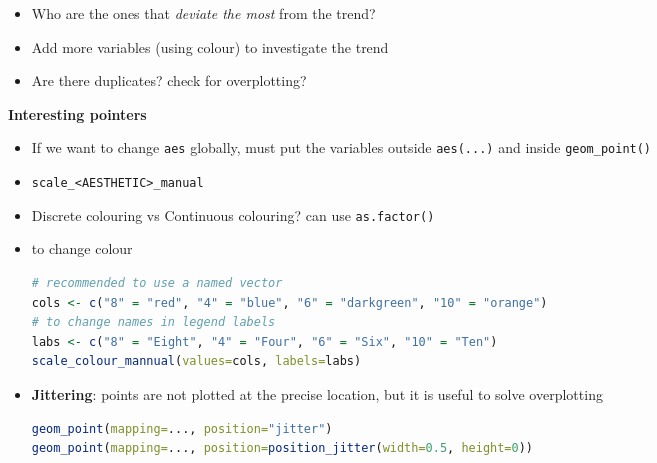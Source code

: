 \documentclass{article}
\begin{document}
\begin{multicols}{2}
\begin{itemize}
\begin{itemize}
	\end{itemize}
    \item Who are the ones that \textit{deviate the most} from the trend?
    \item Add more variables (using colour) to investigate the trend
    \item Are there duplicates? check for overplotting?
\end{itemize}
\textbf{Interesting pointers}
\begin{itemize}
	\item If we want to change \texttt{aes} globally, must put the variables outside \texttt{aes(...)} and inside \texttt{geom\_point()}
	\item \texttt{scale\_<AESTHETIC>\_manual}
	\item Discrete colouring vs Continuous colouring? can use \texttt{as.factor()}
	\item to change colour
	\begin{lstlisting}[language=R]
# recommended to use a named vector
cols <- c("8" = "red", "4" = "blue", "6" = "darkgreen", "10" = "orange")
# to change names in legend labels
labs <- c("8" = "Eight", "4" = "Four", "6" = "Six", "10" = "Ten")
scale_colour_mannual(values=cols, labels=labs)\end{lstlisting}
    \item \textbf{Jittering}: points are not plotted at the precise location, but it is useful to solve overplotting
    \begin{lstlisting}[language=R]
geom_point(mapping=..., position="jitter")
geom_point(mapping=..., position=position_jitter(width=0.5, height=0))\end{lstlisting}
\end{itemize}

\end{multicols}
\end{document}
